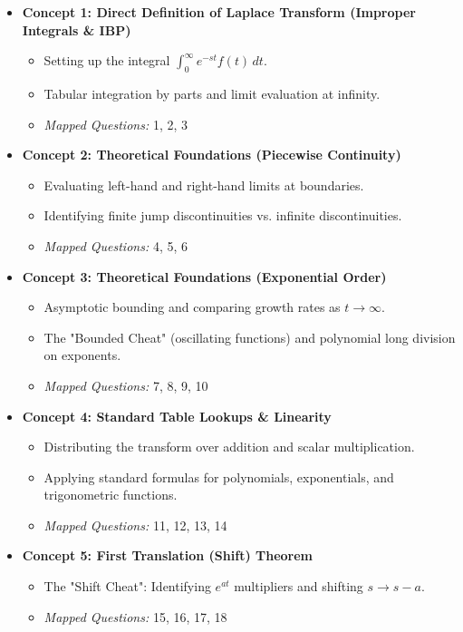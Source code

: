 \documentclass[11pt, letterpaper]{article}
\theoremstyle{definition}
\theoremstyle{remark}
\begin{document}
\begin{itemize}
    \item \textbf{Concept 1: Direct Definition of Laplace Transform (Improper Integrals \& IBP)}
    \begin{itemize}
        \item Setting up the integral $\int_0^\infty e^{-st}f(t)\,dt$.
        \item Tabular integration by parts and limit evaluation at infinity.
        \item \textit{Mapped Questions:} 1, 2, 3
    \end{itemize}
    
    \item \textbf{Concept 2: Theoretical Foundations (Piecewise Continuity)}
    \begin{itemize}
        \item Evaluating left-hand and right-hand limits at boundaries.
        \item Identifying finite jump discontinuities vs. infinite discontinuities.
        \item \textit{Mapped Questions:} 4, 5, 6
    \end{itemize}
    
    \item \textbf{Concept 3: Theoretical Foundations (Exponential Order)}
    \begin{itemize}
        \item Asymptotic bounding and comparing growth rates as $t \to \infty$.
        \item The "Bounded Cheat" (oscillating functions) and polynomial long division on exponents.
        \item \textit{Mapped Questions:} 7, 8, 9, 10
    \end{itemize}
    
    \item \textbf{Concept 4: Standard Table Lookups \& Linearity}
    \begin{itemize}
        \item Distributing the transform over addition and scalar multiplication.
        \item Applying standard formulas for polynomials, exponentials, and trigonometric functions.
        \item \textit{Mapped Questions:} 11, 12, 13, 14
    \end{itemize}
    
    \item \textbf{Concept 5: First Translation (Shift) Theorem}
    \begin{itemize}
        \item The "Shift Cheat": Identifying $e^{at}$ multipliers and shifting $s \to s-a$.
        \item \textit{Mapped Questions:} 15, 16, 17, 18
    \end{itemize}
    

\end{itemize}
\end{document}
